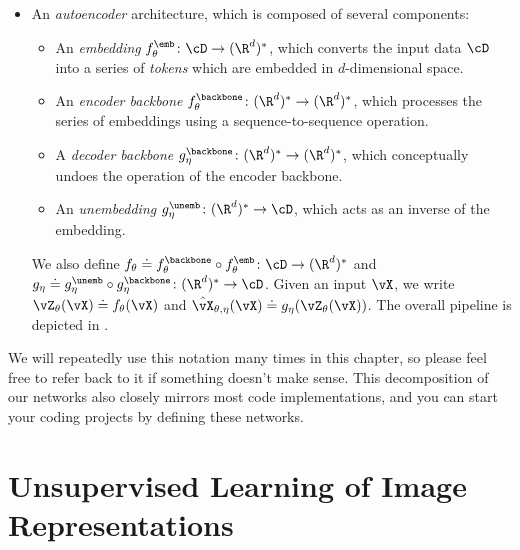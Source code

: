 \documentclass[../../book-main.tex]{subfiles}
\begin{document}
\begin{itemize}
        \circ f_{\theta}^{\emb} \colon \cD \to (\R^{d})^{*}\). Given
        an input \(\vX\), we write \(\vZ_{\theta}(\vX) \doteq
        f_{\theta}(\vX)\) and \(\vz_{\theta}(\vX) \doteq
        f_{\theta}^{\ext}(\vZ_{\theta}(\vX))\). The overall pipeline
        is depicted in .
    \item An \textit{autoencoder} architecture, which is composed of
        several components:
        \begin{itemize}
            \item An \textit{embedding} \(f_{\theta}^{\emb} \colon
                \cD \to (\R^{d})^{*}\), which converts the input data
                \(\cD\) into a series of \textit{tokens} which are
                embedded in \(d\)-dimensional space.
            \item An \textit{encoder backbone}
                \(f_{\theta}^{\backbone} \colon (\R^{d})^{*} \to
                (\R^{d})^{*}\), which processes the series of
                embeddings using a sequence-to-sequence operation.
            \item A \textit{decoder backbone} \(g_{\eta}^{\backbone}
                \colon (\R^{d})^{*} \to (\R^{d})^{*}\), which
                conceptually undoes the operation of the encoder backbone.
            \item An \textit{unembedding} \(g_{\eta}^{\unemb} \colon
                (\R^{d})^{*} \to \cD\), which acts as an inverse of
                the embedding.
        \end{itemize}
        We also define \(f_{\theta} \doteq f_{\theta}^{\backbone}
        \circ f_{\theta}^{\emb} \colon \cD \to (\R^{d})^{*}\) and
        \(g_{\eta} \doteq g_{\eta}^{\unemb} \circ
        g_{\eta}^{\backbone} \colon (\R^{d})^{*} \to \cD\). Given an
        input \(\vX\), we write \(\vZ_{\theta}(\vX) \doteq
        f_{\theta}(\vX)\) and \(\hat{\vX}_{\theta, \eta}(\vX) \doteq
        g_{\eta}(\vZ_{\theta}(\vX))\). The overall pipeline is
        depicted in .
\end{itemize}

We will repeatedly use this notation many times in this chapter, so
please feel free to refer back to it if something doesn't make sense.
This decomposition of our networks also closely mirrors most code
implementations, and you can start your coding projects by defining
these networks.

\section{Unsupervised Learning of Image
Representations}\label{sec:contrastive_learning}
\end{document}
